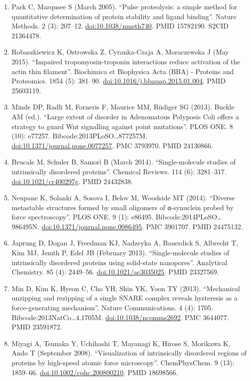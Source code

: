 \documentclass[
]{book}
\begin{document}
\begin{enumerate}
\item
  Park C, Marqusee S (March 2005). ``Pulse proteolysis: a simple method for quantitative determination of protein stability and ligand binding''. Nature Methods. 2 (3): 207--12. \url{doi:10.1038/nmeth740}. PMID 15782190. S2CID 21364478.
\item
  Robaszkiewicz K, Ostrowska Z, Cyranka-Czaja A, Moraczewska J (May 2015). ``Impaired tropomyosin-troponin interactions reduce activation of the actin thin filament''. Biochimica et Biophysica Acta (BBA) - Proteins and Proteomics. 1854 (5): 381--90. \url{doi:10.1016/j.bbapap.2015.01.004}. PMID 25603119.
\item
  Minde DP, Radli M, Forneris F, Maurice MM, Rüdiger SG (2013). Buckle AM (ed.). ``Large extent of disorder in Adenomatous Polyposis Coli offers a strategy to guard Wnt signalling against point mutations''. PLOS ONE. 8 (10): e77257. Bibcode:2013PLoSO\ldots877257M. \url{doi:10.1371/journal.pone.0077257}. PMC 3793970. PMID 24130866.
\item
  Brucale M, Schuler B, Samorì B (March 2014). ``Single-molecule studies of intrinsically disordered proteins''. Chemical Reviews. 114 (6): 3281--317. \url{doi:10.1021/cr400297g}. PMID 24432838.
\item
  Neupane K, Solanki A, Sosova I, Belov M, Woodside MT (2014). ``Diverse metastable structures formed by small oligomers of α-synuclein probed by force spectroscopy''. PLOS ONE. 9 (1): e86495. Bibcode:2014PLoSO\ldots986495N. \url{doi:10.1371/journal.pone.0086495}. PMC 3901707. PMID 24475132.
\item
  Japrung D, Dogan J, Freedman KJ, Nadzeyka A, Bauerdick S, Albrecht T, Kim MJ, Jemth P, Edel JB (February 2013). ``Single-molecule studies of intrinsically disordered proteins using solid-state nanopores''. Analytical Chemistry. 85 (4): 2449--56. \url{doi:10.1021/ac3035025}. PMID 23327569.
\item
  Min D, Kim K, Hyeon C, Cho YH, Shin YK, Yoon TY (2013). ``Mechanical unzipping and rezipping of a single SNARE complex reveals hysteresis as a force-generating mechanism''. Nature Communications. 4 (4): 1705. Bibcode:2013NatCo\ldots4.1705M. \url{doi:10.1038/ncomms2692}. PMC 3644077. PMID 23591872.
\item
  Miyagi A, Tsunaka Y, Uchihashi T, Mayanagi K, Hirose S, Morikawa K, Ando T (September 2008). ``Visualization of intrinsically disordered regions of proteins by high-speed atomic force microscopy''. ChemPhysChem. 9 (13): 1859--66. \url{doi:10.1002/cphc.200800210}. PMID 18698566.

\end{enumerate}
\end{document}
